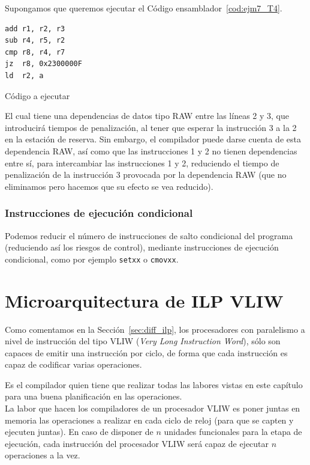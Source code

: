 \begin{ejemplo}
    Supongamos que queremos ejecutar el Código ensamblador~\ref{cod:ejm7_T4}.
    \begin{listing}[H]
    \begin{verbatim}
add r1, r2, r3
sub r4, r5, r2
cmp r8, r4, r7
jz  r8, 0x2300000F
ld  r2, a
    \end{verbatim}
    \caption{Código a ejecutar}
    \label{cod:ejm7_T4}
    \end{listing}
    El cual tiene una dependencias de datos tipo RAW entre las líneas 2 y 3, que introducirá tiempos de penalización, al tener que esperar la instrucción 3 a la 2 en la estación de reserva. Sin embargo, el compilador puede darse cuenta de esta dependencia RAW, así como que las instrucciones 1 y 2 no tienen dependencias entre sí, para intercambiar las instrucciones 1 y 2, reduciendo el tiempo de penalización de la instrucción 3 provocada por la dependencia RAW (que no eliminamos pero hacemos que su efecto se vea reducido).
\end{ejemplo}

\subsubsection{Instrucciones de ejecución condicional}
Podemos reducir el número de instrucciones de salto condicional del programa (reduciendo así los riesgos de control), mediante instrucciones de ejecución condicional, como por ejemplo \verb|setxx| o \verb|cmovxx|.

\section{Microarquitectura de ILP VLIW}
Como comentamos en la Sección~\ref{sec:diff_ilp}, los procesadores con paralelismo a nivel de instrucción del tipo VLIW (\emph{Very Long Instruction Word}), sólo son capaces de emitir una instrucción por ciclo, de forma que cada instrucción es capaz de codificar varias operaciones.

Es el compilador quien tiene que realizar todas las labores vistas en este capítulo para una buena planificación en las operaciones.\\

La labor que hacen los compiladores de un procesador VLIW es poner juntas en memoria las operaciones a realizar en cada ciclo de reloj (para que se capten y ejecuten juntas). En caso de disponer de $n$ unidades funcionales para la etapa de ejecución, cada instrucción del procesador VLIW será capaz de ejecutar $n$ operaciones a la vez.\\

